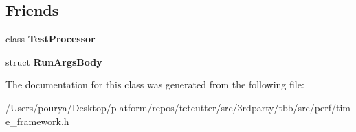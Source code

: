 \subsection*{Friends}
\begin{DoxyCompactItemize}
\item 
\hypertarget{classTestRunner_a3572f7bef6d46d09a8579123b0752fd6}{}class {\bfseries Test\+Processor}\label{classTestRunner_a3572f7bef6d46d09a8579123b0752fd6}

\item 
\hypertarget{classTestRunner_a4866e069faf39f8850a659879041ef0f}{}struct {\bfseries Run\+Args\+Body}\label{classTestRunner_a4866e069faf39f8850a659879041ef0f}

\end{DoxyCompactItemize}


The documentation for this class was generated from the following file\+:\begin{DoxyCompactItemize}
\item 
/\+Users/pourya/\+Desktop/platform/repos/tetcutter/src/3rdparty/tbb/src/perf/time\+\_\+framework.\+h\end{DoxyCompactItemize}
